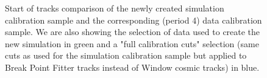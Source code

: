 \documentclass[12pt]{article}
\begin{document}
\begin{figure}[!ht]

\caption{Start of tracks comparison of the newly created simulation calibration sample and the corresponding (period 4) data calibration sample. We are also showing the selection of data used to create the new simulation in green and a "full calibration cuts" selection (same cuts as used for the simulation calibration sample but applied to Break Point Fitter tracks instead of Window cosmic tracks) in blue.}
\label{figDataMCComparison_startXstartY}
\end{figure}
\end{document}

